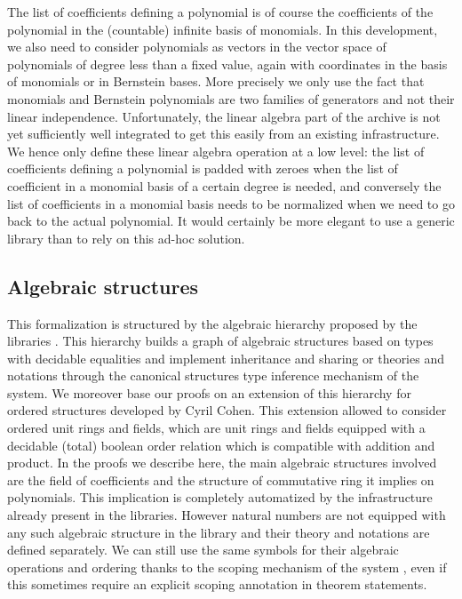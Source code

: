 \documentclass{mscs}
\begin{document}
The list of coefficients defining a polynomial is of course the
coefficients of the polynomial in the (countable) infinite basis of
monomials. In this development, we also need to consider polynomials
as vectors in the vector space of polynomials of degree less than a
fixed value, again with coordinates in the basis of monomials or in
Bernstein bases. More precisely we only use the fact that monomials
and Bernstein polynomials are two families of generators and not their
linear independence. Unfortunately, the linear algebra part of the
\ssr{} archive is not yet sufficiently well integrated to get this
easily from an existing infrastructure. We hence only define these
linear algebra operation at a low level: the list of coefficients
defining a polynomial is padded with zeroes when the list of
coefficient in a monomial basis of a certain degree is needed, and
conversely the list of coefficients in a monomial basis needs to be
normalized when we need to go back to the actual polynomial.
It would certainly be more elegant to use a generic library than to
rely on this ad-hoc solution.

\subsection{Algebraic structures}\label{ssec:algstruct}

This formalization is structured by the algebraic hierarchy proposed
by the \ssr{} libraries \cite{hieralg}. This hierarchy builds a graph
of algebraic structures based on types with decidable equalities and
implement inheritance and sharing or theories and notations through
the canonical structures type inference mechanism of the \Coq{}
system. We moreover base our proofs on an extension of this hierarchy
for ordered structures developed by Cyril Cohen. This extension
allowed to consider ordered unit rings and fields, which are unit
rings and fields equipped with a decidable (total) boolean order
relation which is compatible with addition and product. In the proofs
we describe here, the main algebraic structures involved are the field
of coefficients and the structure of commutative ring it implies on
polynomials. This implication is completely automatized by the
infrastructure already present in the \ssr{} libraries. However
natural numbers are not equipped with any such algebraic structure in
the \ssr{} library and their theory and notations are defined
separately. We can still use the same symbols for their algebraic
operations and ordering thanks to the scoping mechanism of the \Coq{}
system \cite{coqart}, even if this sometimes require an explicit
scoping annotation in theorem statements.
\end{document}
